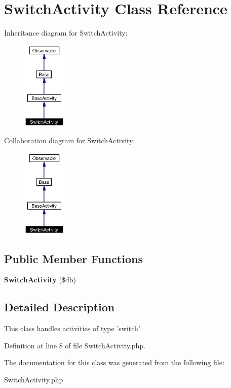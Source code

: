 \section{Switch\-Activity Class Reference}
\label{classSwitchActivity}
Inheritance diagram for Switch\-Activity:\begin{figure}[H]
\begin{center}
\leavevmode
\includegraphics[width=59pt]{classSwitchActivity__inherit__graph}
\end{center}
\end{figure}
Collaboration diagram for Switch\-Activity:\begin{figure}[H]
\begin{center}
\leavevmode
\includegraphics[width=59pt]{classSwitchActivity__coll__graph}
\end{center}
\end{figure}
\subsection*{Public Member Functions}
\begin{CompactItemize}
\item 
{\bf Switch\-Activity} (\$db)\label{classSwitchActivity_a0}

\end{CompactItemize}


\subsection{Detailed Description}
This class handles activities of type 'switch' 



Definition at line 8 of file Switch\-Activity.php.

The documentation for this class was generated from the following file:\begin{CompactItemize}
\item 
Switch\-Activity.php\end{CompactItemize}
